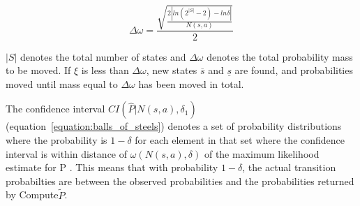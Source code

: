 \begin{equation}
  \Delta \omega = \frac{\sqrt{\frac{2|ln(2^{|S|}-2) - ln  \delta |}{N(s,a)}}}{2}
\end{equation}

$|S|$ denotes the total number of states and $\Delta \omega$ denotes the total
probability mass to be moved. If $\xi$ is less than $\Delta \omega$, new states
$\overline{s}$ and $\underline{s}$ are found, and probabilities moved until
mass equal to $\Delta \omega$ has been moved in total. 

The confidence interval $CI(\hat{P} | N(s, a), \delta_1)$
(equation~\eqref{equation:balls_of_steels}) denotes a set of probability
distributions where the probability is $1 - \delta$ for each element in that
set where the confidence interval is within distance of $\omega(N(s,a),\delta)$
of the maximum likelihood estimate for P \parencite{dietterich2013pac}. This
means that with probability $1-\delta$, the actual transition probabilties are
between the observed probabilities and the probabilities returned by
Compute$\tilde{P}$.

\label{goto}
